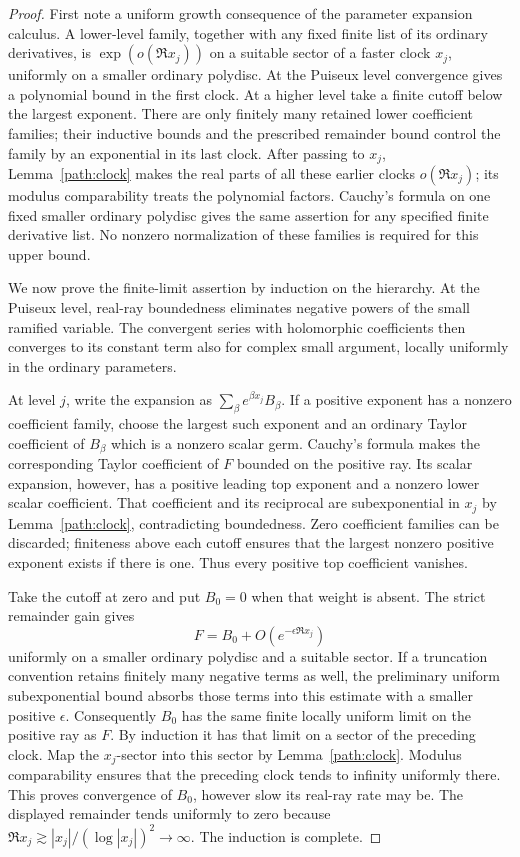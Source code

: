 \begin{proof}
First note a uniform growth consequence of the parameter expansion
calculus.  A lower-level family, together with any fixed finite list
of its ordinary derivatives, is \(\exp(o(\Re x_j))\) on a suitable
sector of a faster clock \(x_j\), uniformly on a smaller ordinary
polydisc.  At the Puiseux level convergence gives a polynomial bound
in the first clock.  At a higher level take a finite cutoff below
the largest exponent.  There are only finitely many retained lower
coefficient families; their inductive bounds and the prescribed
remainder bound control the family by an exponential in its last
clock.  After passing to \(x_j\), Lemma~\ref{path:clock} makes the
real parts of all these earlier clocks \(o(\Re x_j)\); its modulus
comparability treats the polynomial factors.  Cauchy's formula on
one fixed smaller ordinary polydisc gives the same assertion for
any specified finite derivative list.  No nonzero normalization of
these families is required for this upper bound.

We now prove the finite-limit assertion by induction on the hierarchy.
At the Puiseux level, real-ray boundedness eliminates negative powers
of the small ramified variable.  The convergent series with holomorphic
coefficients then converges to its constant term also for complex
small argument, locally uniformly in the ordinary parameters.

At level \(j\), write the expansion as
\(\sum_\beta e^{\beta x_j}B_\beta\).  If a positive exponent has a
nonzero coefficient family, choose the largest such exponent and an
ordinary Taylor coefficient of \(B_\beta\) which is a nonzero scalar
germ.  Cauchy's formula makes the corresponding Taylor coefficient
of \(F\) bounded on the positive ray.  Its scalar expansion, however,
has a positive leading top exponent and a nonzero lower scalar
coefficient.  That coefficient and its reciprocal are subexponential
in \(x_j\) by Lemma~\ref{path:clock}, contradicting boundedness.
Zero coefficient families can be discarded; finiteness above each
cutoff ensures that the largest nonzero positive exponent exists if
there is one.  Thus every positive top coefficient vanishes.

Take the cutoff at zero and put \(B_0=0\) when that weight is absent.
The strict remainder gain gives
\[
 F=B_0+O(e^{-\epsilon\Re x_j})
\]
uniformly on a smaller ordinary polydisc and a suitable sector.  If
a truncation convention retains finitely many negative terms as well,
the preliminary uniform subexponential bound absorbs those terms
into this estimate with a smaller positive \(\epsilon\).
Consequently \(B_0\) has the same finite locally uniform limit on
the positive ray as \(F\).  By induction it has that limit on a
sector of the preceding clock.  Map the \(x_j\)-sector into this
sector by Lemma~\ref{path:clock}.  Modulus comparability ensures that
the preceding clock tends to infinity uniformly there.  This proves
convergence of \(B_0\), however slow its real-ray rate may be.
The displayed remainder tends uniformly to zero because
\(\Re x_j\gtrsim|x_j|/(\log|x_j|)^2\to\infty\).  The induction
is complete.


\end{proof}
